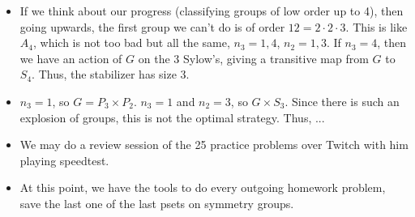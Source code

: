 \documentclass[../notes.tex]{subfiles}
\begin{document}
\begin{itemize}
    \item If we think about our progress (classifying groups of low order up to 4), then going upwards, the first group we can't do is of order $12=2\cdot 2\cdot 3$. This is like $A_4$, which is not too bad but all the same, $n_3=1,4$, $n_2=1,3$. If $n_3=4$, then we have an action of $G$ on the 3 Sylow's, giving a transitive map from $G$ to $S_4$. Thus, the stabilizer has size 3.
    \item $n_3=1$, so $G=P_3\times P_2$. $n_3=1$ and $n_2=3$, so $G\times S_3$. Since there is such an explosion of groups, this is not the optimal strategy. Thus, ...
    \item We may do a review session of the 25 practice problems over Twitch with him playing speedtest.
    \item At this point, we have the tools to do every outgoing homework problem, save the last one of the last psets on symmetry groups.
\end{itemize}
\end{document}
